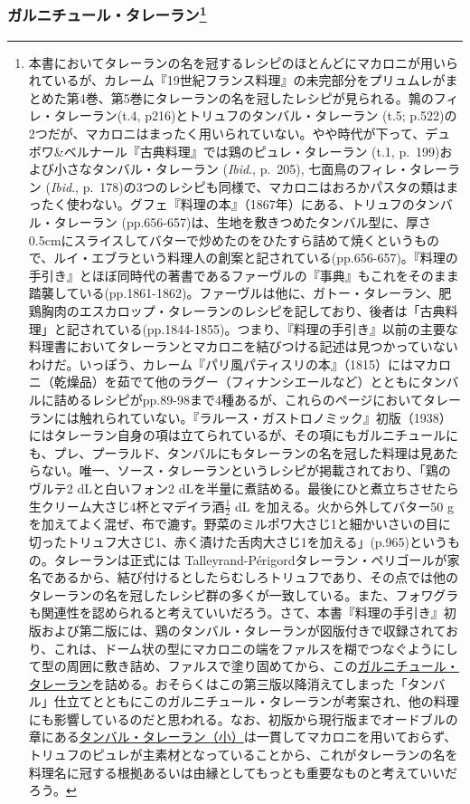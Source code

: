 \begin{recette}
{\subsubsection[ガルニチュール・タレーラン]{\texorpdfstring{ガルニチュール・タレーラン\footnote{本書においてタレーランの名を冠するレシピのほとんどにマカロニが用いられているが、カレーム『19世紀フランス料理』の未完部分をプリュムレがまとめた第4巻、第5巻にタレーランの名を冠したレシピが見られる。鶉のフィレ・タレーラン(t.4,
  p216)とトリュフのタンバル・タレーラン (t.5;
  p.522)の2つだが、マカロニはまったく用いられていない。やや時代が下って、デュボワ\&ベルナール『古典料理』では鶏のピュレ・タレーラン
  (t.1, p.~199)および小さなタンバル・タレーラン (\emph{Ibid}., p.~205),
  七面鳥のフィレ・タレーラン (\emph{Ibid}.,
  p.~178)の3つのレシピも同様で、マカロニはおろかパスタの類はまったく使わない。グフェ『料理の本』（1867年）にある、トリュフのタンバル・タレーラン
  (pp.656-657)は、生地を敷きつめたタンバル型に、厚さ0.5cmにスライスしてバターで炒めたのをひたすら詰めて焼くというもので、ルイ・エブラという料理人の創案と記されている(pp.656-657)。『料理の手引き』とほぼ同時代の著書であるファーヴルの『事典』もこれをそのまま踏襲している(pp.1861-1862)。ファーヴルは他に、ガトー・タレーラン、肥鶏胸肉のエスカロップ・タレーランのレシピを記しており、後者は「古典料理」と記されている(pp.1844-1855)。つまり、『料理の手引き』以前の主要な料理書においてタレーランとマカロニを結びつける記述は見つかっていないわけだ。いっぽう、カレーム『パリ風パティスリの本』（1815）にはマカロニ（乾燥品）を茹でて他のラグー（フィナンシエールなど）とともにタンバルに詰めるレシピがpp.89-98まで4種あるが、これらのページにおいてタレーランには触れられていない。『ラルース・ガストロノミック』初版（1938）にはタレーラン自身の項は立てられているが、その項にもガルニチュールにも、プレ、プーラルド、タンバルにもタレーランの名を冠した料理は見あたらない。唯一、ソース・タレーランというレシピが掲載されており、「鶏のヴルテ2
  dLと白いフォン2
  dLを半量に煮詰める。最後にひと煮立ちさせたら生クリーム大さじ4杯とマデイラ酒\(\frac{1}{2}\)
  dL を加える。火から外してバター50
  gを加えてよく混ぜ、布で漉す。野菜のミルポワ大さじ1と細かいさいの目に切ったトリュフ大さじ1、赤く漬けた舌肉大さじ1を加える」(p.965)というもの。タレーランは正式には
  Talleyrand-Périgordタレーラン・ペリゴールが家名であるから、結び付けるとしたらむしろトリュフであり、その点では他のタレーランの名を冠したレシピ群の多くが一致している。また、フォワグラも関連性を認められると考えていいだろう。さて、本書『料理の手引き』初版および第二版には、鶏のタンバル・タレーランが図版付きで収録されており、これは、ドーム状の型にマカロニの端をファルスを糊でつなぐようにして型の周囲に敷き詰め、ファルスで塗り固めてから、この\protect\hyperlink{garniture-talleyrand}{ガルニチュール・タレーラン}を詰める。おそらくはこの第三版以降消えてしまった「タンバル」仕立てとともにこのガルニチュール・タレーランが考案され、他の料理にも影響しているのだと思われる。なお、初版から現行版までオードブルの章にある\protect\hyperlink{timbales-talleyrand-petites}{タンバル・タレーラン（小）}は一貫してマカロニを用いておらず、トリュフのピュレが主素材となっていることから、これがタレーランの名を料理名に冠する根拠あるいは由縁としてもっとも重要なものと考えていいだろう。}}{ガルニチュール・タレーラン}}\label{garniture-talleyrand}}


\end{recette}
